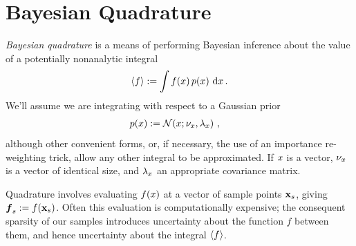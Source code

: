 \documentclass{article}
\begin{document}
\section{Bayesian Quadrature} \label{sec:BQ}


\emph{Bayesian quadrature} \citep{BZHermiteQuadrature,BZMonteCarlo} is a means of performing Bayesian inference about the value of a potentially nonanalytic integral 
\begin{equation} \label{eq:intyf}
 \inty{f} \deq \int f(\lfv)\,\po{\lfv}\,\ud\lfv\,.
\end{equation}
We'll assume we are integrating with respect to a Gaussian prior
\begin{align}\label{eq:phiprior}
\textstyle
 \po{\lfv} & \deq \N{\lfv}{\nu_{\lfv}}{\lambda_{\lfv}} \,,
\end{align}
although other convenient forms, or, if necessary, the use of an importance re-weighting trick, allow any other integral to be approximated. If $\lfv$ is a vector, $\nu_{\lfv}$ is a  vector of identical size, and $\lambda_{\lfv}$ an appropriate covariance matrix.

Quadrature involves evaluating $f(\lfv)$ at a vector of sample points $\vlfv_s$, giving $\vf\pha_s\deq f(\vlfv_s)$. Often this evaluation is computationally expensive; the consequent sparsity of our samples introduces uncertainty about the function $f$ between them, and hence uncertainty about the integral $\inty{f}$.


\end{document}
